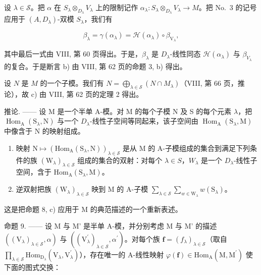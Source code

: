 设 \(\lambda \in \mathcal{S}\)。把 \(\alpha\) 在 \(S_{\lambda} \otimes_{D_{\lambda}} V_{\lambda}\) 上的限制记作 \(\alpha_{\lambda}: S_{\lambda} \otimes_{D_{\lambda}} V_{\lambda} \to M\)。把 No.~3 的记号应用于 \((A, D_{\lambda})\)-双模 \(S_{\lambda}\)，我们有

\[
\beta_ {\lambda} = \gamma (\alpha_ {\lambda}) = \mathcal {H} (\alpha_ {\lambda}) \circ \beta_ {\mathrm{V} _ {\lambda}},
\]

其中最后一式由 VIII, 第 60 页得出。于是，\(\beta_{\lambda}\) 是 \(D_{\lambda}\)-线性同态 \(\mathcal{H}(\alpha_{\lambda})\) 与 \(\beta_{V_{\lambda}}\) 的复合。于是断言 b) 由 VIII, 第 62 页的命题 3, b) 得出。

设 \(N\) 是 \(M\) 的一个子模。我们有 \(N = \bigoplus_{\lambda \in \mathcal{S}} (N \cap M_{\lambda})\)（VIII, 第 66 页，推论），故 c) 由 VIII, 第 62 页的定理 2 得出。

推论. —— 设 M 是一个半单 A-模。对 M 的每个子模 N 及 S 的每个元素 \(\lambda\)，把 \(\operatorname{Hom}_{\mathrm{A}}(\mathrm{S}_{\lambda},\mathrm{N})\) 与一个 \(D_{\lambda}\)-线性子空间等同起来，该子空间由 \(\operatorname{Hom}_{\mathrm{A}}(\mathrm{S}_{\lambda},\mathrm{M})\) 中像含于 N 的映射组成。

\begin{enumerate}
\def\labelenumi{\alph{enumi})}
\item
  映射 \(\mathrm{N}\mapsto(\mathrm{Hom}_{\mathrm{A}}(\mathrm{S}_{\lambda},\mathrm{N}))_{\lambda\in\mathcal{S}}\) 是从 M 的 A-子模组成的集合到满足下列条件的族 \((\mathrm{W}_{\lambda})_{\lambda\in\mathcal{S}}\) 组成的集合的双射：对每个 \(\lambda\in S\)，\(W_{\lambda}\) 是一个 \(D_{\lambda}\)-线性子空间，含于 \(\mathrm{Hom}_{\mathrm{A}}(\mathrm{S}_{\lambda},\mathrm{M})\)。
\item
  逆双射把族 \((\mathrm{W}_{\lambda})_{\lambda \in \mathcal{S}}\) 映到 M 的 A-子模 \(\sum_{\lambda \in \mathcal{S}}\sum_{w\in \mathrm{W}_{\lambda}}w(\mathrm{S}_{\lambda})\)。
\end{enumerate}

这是把命题 8, c) 应用于 M 的典范描述的一个重新表述。

命题 9. —— 设 M 与 M' 是半单 A-模，并分别考虑 M 与 M' 的描述 \(((\mathrm{V}_{\lambda})_{\lambda\in\mathcal{S}},\alpha)\) 与 \(((\mathrm{V}_{\lambda}^{\prime})_{\lambda\in\mathcal{S}},\alpha^{\prime})\)。对每个族 \(\boldsymbol{f}=(f_{\lambda})_{\lambda\in\mathcal{S}}\)（取自 \(\prod_{\lambda\in\mathcal{S}}\mathrm{Hom}_{\mathrm{D}_{\lambda}}(\mathrm{V}_{\lambda},\mathrm{V}_{\lambda}^{\prime})\)），存在唯一的 A-线性映射 \(\varphi(\boldsymbol{f})\in\mathrm{Hom}_{\mathrm{A}}(\mathrm{M},\mathrm{M}^{\prime})\) 使下面的图式交换：

